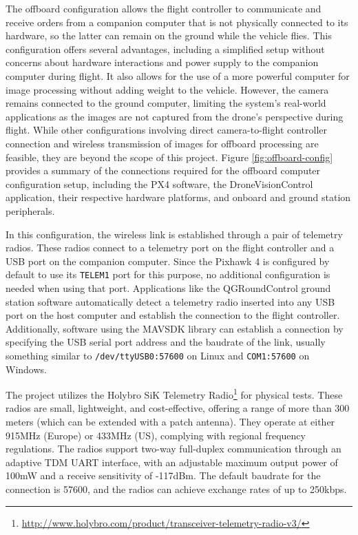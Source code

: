 The offboard configuration allows the flight controller to communicate and receive orders from a companion computer that is not physically connected to its hardware, so the latter can remain on the ground while the vehicle flies.
This configuration offers several advantages, including a simplified setup without concerns about hardware interactions and power supply to the companion computer during flight. It also allows for the use of a more powerful computer for image processing without adding weight to the vehicle. However, the camera remains connected to the ground computer, limiting the system's real-world applications as the images are not captured from the drone's perspective during flight. While other configurations involving direct camera-to-flight controller connection and wireless transmission of images for offboard processing are feasible, they are beyond the scope of this project. Figure \ref{fig:offboard-config} provides a summary of the connections required for the offboard computer configuration setup, including the PX4 software, the DroneVisionControl application, their respective hardware platforms, and onboard and ground station peripherals.

In this configuration, the wireless link is established through a pair of telemetry radios.
These radios connect to a telemetry port on the flight controller and a USB port on the companion computer. 
Since the Pixhawk 4 is configured by default to use its \texttt{TELEM1} port for this purpose, no additional configuration is needed when using that port.
Applications like the QGRoundControl ground station software automatically detect a telemetry radio inserted into any USB port on the host computer and establish the connection to the flight controller.
Additionally, software using the MAVSDK library can establish a connection by specifying the USB serial port address and the baudrate of the link, usually something similar to \texttt{/dev/ttyUSB0:57600} on Linux and \texttt{COM1:57600} on Windows.

The project utilizes the Holybro SiK Telemetry Radio\footnote{\url{http://www.holybro.com/product/transceiver-telemetry-radio-v3/}} for physical tests. These radios are small, lightweight, and cost-effective, offering a range of more than 300 meters (which can be extended with a patch antenna). They operate at either 915MHz (Europe) or 433MHz (US), complying with regional frequency regulations. The radios support two-way full-duplex communication through an adaptive TDM UART interface, with an adjustable maximum output power of 100mW and a receive sensitivity of -117dBm. The default baudrate for the connection is 57600, and the radios can achieve exchange rates of up to 250kbps.


